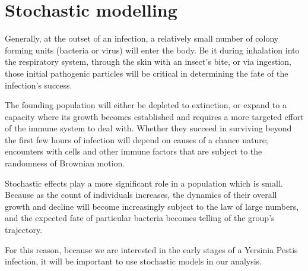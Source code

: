 \section{Stochastic modelling}

Generally, at the outset of an infection, a relatively small number of colony forming units (bacteria or virus) will enter the body. 
Be it during inhalation into the respiratory system, through the skin with an insect's bite, or via ingestion, those initial pathogenic particles will be critical in determining the fate of the infection's success. 

The founding population will either be depleted to extinction, or expand to a capacity where its growth becomes established and requires a more targeted effort of the immune system to deal with. Whether they succeed in surviving beyond the first few hours of infection will depend on causes of a chance nature; encounters with cells and other immune factors that are subject to the randomness of Brownian motion.  


Stochastic effects play a more significant role in a population which is small. Because as the count of individuals increases, the dynamics of their overall growth and decline will become increasingly subject to the law of large numbers, and the expected fate of particular bacteria becomes telling of the group's trajectory. 

For this reason, because we are interested in the early stages of a Yersinia Pestis infection, it will be important to use stochastic models in our analysis.
